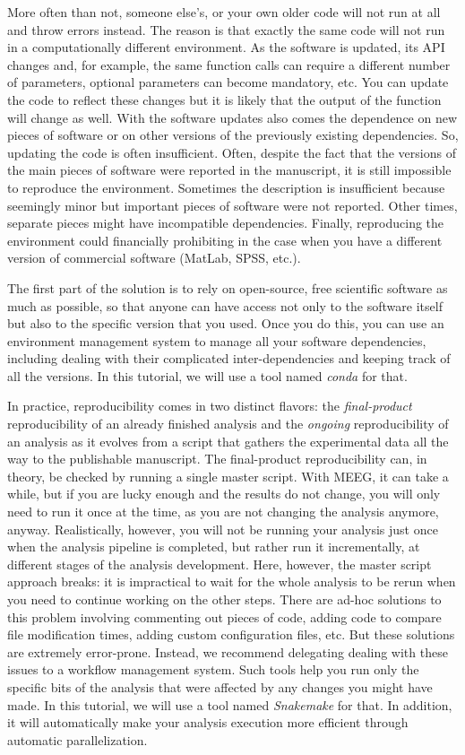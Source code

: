 \documentclass[a4paper,man,floatsintext,natbib]{apa6}
\begin{document}
More often than not, someone else's, or your own older code will not run at all and throw errors instead. The reason is that exactly the same code will not run in a computationally different environment. As the software is updated, its API changes and, for example, the same function calls can require a different number of parameters, optional parameters can become mandatory, etc. You can update the code to reflect these changes but it is likely that the output of the function will change as well. With the software updates also comes the dependence on new pieces of software or on other versions of the previously existing dependencies. So, updating the code is often insufficient. 
Often, despite the fact that the versions of the main pieces of software were reported in the manuscript, it is still impossible to reproduce the environment.
Sometimes the description is insufficient because seemingly minor but important pieces of software were not reported.
Other times, separate pieces might have incompatible dependencies.
Finally, reproducing the environment could financially prohibiting in the case when you have a different version of commercial software (MatLab, SPSS, etc.).

The first part of the solution is to rely on open-source, free scientific software as much as possible, so that anyone can have access not only to the software itself but also to the specific version that you used. Once you do this, you can use an environment management system to manage all your software dependencies, including dealing with their complicated inter-dependencies and keeping track of all the versions. In this tutorial, we will use a tool named \emph{conda} for that.

In practice, reproducibility comes in two distinct flavors: the \emph{final-product} reproducibility of an already finished analysis and the \emph{ongoing} reproducibility of an analysis as it evolves from a script that gathers the experimental data all the way to the publishable manuscript. The final-product reproducibility can, in theory, be checked by running a single master script. With MEEG, it can take a while, but if you are lucky enough and the results do not change, you will only need to run it once at the time, as you are not changing the analysis anymore, anyway.
Realistically, however, you will not be running your analysis just once when the analysis pipeline is completed, but rather run it incrementally, at different stages of the analysis development. 
Here, however, the master script approach breaks: it is impractical to wait for the whole analysis to be rerun when you need to continue working on the other steps.
There are ad-hoc solutions to this problem involving commenting out pieces of code, adding code to compare file modification times, adding custom configuration files, etc.
But these solutions are extremely error-prone.
Instead, we recommend delegating dealing with these issues to a workflow management system.
Such tools help you run only the specific bits of the analysis that were affected by any changes you might have made.
In this tutorial, we will use a tool named \emph{Snakemake} for that.
In addition, it will automatically make your analysis execution more efficient through automatic parallelization.
\end{document}
